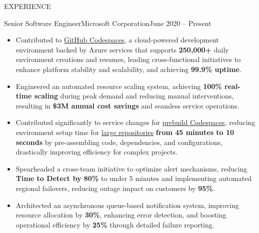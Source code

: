 \documentclass[]{mcdowellcv}
\begin{document}
	\makeheader
	
	\begin{cvsection}{EXPERIENCE}
	    \begin{cvsubsection}{Senior Software Engineer}{Microsoft Corporation}{June 2020 -- Present}
			\begin{itemize}
				\item Contributed to \href{https://github.com/features/codespaces}{GitHub Codespaces}, a cloud-powered development environment backed by Azure services that supports \textbf{250,000+} daily environment creations and resumes, leading cross-functional initiatives to enhance platform stability and scalability, and achieving \textbf{99.9\% uptime}.
                    \item Engineered an automated resource scaling system, achieving \textbf{100\% real-time scaling} during peak demand and reducing manual interventions, resulting in \textbf{\$3M annual cost savings} and seamless service operations.
                    \item Contributed significantly to service changes for \href{https://docs.github.com/en/codespaces/prebuilding-your-codespaces/about-github-codespaces-prebuilds}{prebuild Codespaces}, reducing environment setup time for \href{https://github.blog/engineering/githubs-engineering-team-moved-codespaces/#45-minutes-to-5-minutes}{large repositories} \textbf{from 45 minutes to 10 seconds} by pre-assembling code, dependencies, and configurations, drastically improving efficiency for complex projects.
                    \item Spearheaded a cross-team initiative to optimize alert mechanisms, reducing \textbf{Time to Detect by 80\%} to under 5 minutes and implementing automated regional failovers, reducing outage impact on customers by \textbf{95\%}.
                    \item Architected an asynchronous queue-based notification system, improving resource allocation by \textbf{30\%}, enhancing error detection, and boosting operational efficiency by \textbf{25\%} through detailed failure reporting.
		
			\end{itemize}
   

\end{cvsubsection}
\end{cvsection}
\end{document}
